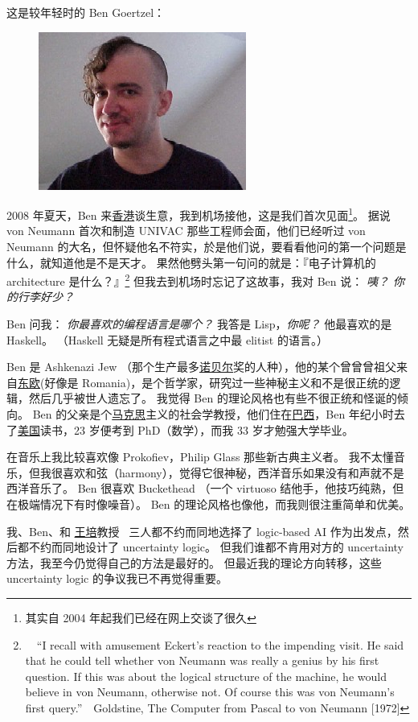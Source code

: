 \documentclass[12pt]{report}
\newcommand{\speechCn}[1]{\textrm{\textit{\textcolor{Speech}{#1}}}}
\newcommand*\dashh{\,\,\textemdash\kern-1pt\textemdash\,\,}
\begin{document}
{这是较年轻时的 Ben Goertzel：
\begin{figure}[H]
\centering
\includegraphics[scale=2.5]{benbenben.jpg}
\end{figure}

2008 年夏天，Ben 来\uline{香港}谈生意，我到机场接他，这是我们首次见面\footnote{其实自 2004 年起我们已经在网上交谈了很久}。 据说 von Neumann 首次和制造 UNIVAC 那些工程师会面，他们已经听过 von Neumann 的大名，但怀疑他名不符实，於是他们说，要看看他问的第一个问题是什么，就知道他是不是天才。  果然他劈头第一句问的就是：『电子计算机的 architecture 是什么？』\footnote{\ \  ``I recall with amusement Eckert's reaction to the impending visit. He said that he could tell whether von Neumann was really a genius by his first question. If this was about the logical structure of the machine, he would believe in von Neumann, otherwise not. Of course this was von Neumann's first query.'' \dashh Goldstine, The Computer from Pascal to von Neumann [1972]}  但我去到机场时忘记了这故事，我对 Ben 说： \speechCn{咦？ 你的行李好少？}

Ben 问我： \speechCn{你最喜欢的编程语言是哪个？} 我答是 Lisp，\speechCn{你呢？} 他最喜欢的是 Haskell。 （Haskell 无疑是所有程式语言之中最 elitist 的语言。）

Ben 是 Ashkenazi Jew （那个生产最多\uline{诺贝尔}奖的人种），他的某个曾曾曾祖父来自\uline{东欧}(好像是 Romania)，是个哲学家，研究过一些神秘主义和不是很正统的逻辑，然后几乎被世人遗忘了。 我觉得 Ben 的理论风格也有些不很正统和怪诞的倾向。  Ben 的父亲是个\uline{马克思}主义的社会学教授，他们住在\uline{巴西}，Ben 年纪小时去了\uline{美国}读书，23 岁便考到 PhD（数学），而我 33 岁才勉强大学毕业。

在音乐上我比较喜欢像 Prokofiev，Philip Glass 那些新古典主义者。 我不太懂音乐，但我很喜欢和弦（harmony），觉得它很神秘，西洋音乐如果没有和声就不是西洋音乐了。 Ben 很喜欢 Buckethead （一个 virtuoso 结他手，他技巧纯熟，但在极端情况下有时像噪音）。 Ben 的理论风格也像他，而我则很注重简单和优美。

我、Ben、和 \uline{王培}教授 ~三人都不约而同地选择了 logic-based AI 作为出发点，然后都不约而同地设计了 uncertainty logic。  但我们谁都不肯用对方的 uncertainty 方法，我至今仍觉得自己的方法是最好的。 但最近我的理论方向转移，这些 uncertainty logic 的争议我已不再觉得重要。

}
\end{document}
